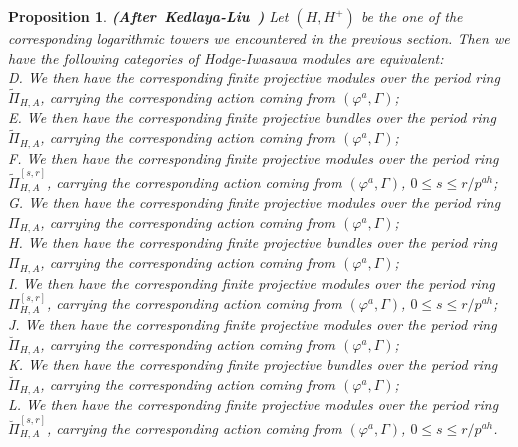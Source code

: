 \documentclass[12pt]{amsart}
\newtheorem{proposition}[theorem]{Proposition}
\theoremstyle{definition}
\numberwithin{equation}{section}
\begin{document}
\begin{proposition} \mbox{\bf{(After Kedlaya-Liu \cite[Theorem 5.7.4]{KL16})}} Let $(H,H^+)$ be the one of the corresponding logarithmic towers we encountered in the previous section. Then we have the following categories of Hodge-Iwasawa modules are equivalent:\\
\noindent D. We then have the corresponding finite projective modules over the period ring ${\widetilde{\Pi}}_{H,A}$, carrying the corresponding action coming from $(\varphi^a,\Gamma)$;\\
\noindent E. We then have the corresponding finite projective bundles over the period ring ${\widetilde{\Pi}}_{H,A}$, carrying the corresponding action coming from $(\varphi^a,\Gamma)$;\\
\noindent F. We then have the corresponding finite projective modules over the period ring ${\widetilde{\Pi}}^{[s,r]}_{H,A}$, carrying the corresponding action coming from $(\varphi^a,\Gamma)$, $0\leq s\leq r/p^{ah}$;\\
\noindent G. We then have the corresponding finite projective modules over the period ring ${{\Pi}}_{H,A}$, carrying the corresponding action coming from $(\varphi^a,\Gamma)$;\\
\noindent H. We then have the corresponding finite projective bundles over the period ring ${{\Pi}}_{H,A}$, carrying the corresponding action coming from $(\varphi^a,\Gamma)$;\\
\noindent I. We then have the corresponding finite projective modules over the period ring ${{\Pi}}^{[s,r]}_{H,A}$, carrying the corresponding action coming from $(\varphi^a,\Gamma)$, $0\leq s\leq r/p^{ah}$;\\
\noindent J. We then have the corresponding finite projective modules over the period ring ${\breve{\Pi}}_{H,A}$, carrying the corresponding action coming from $(\varphi^a,\Gamma)$;\\
\noindent K. We then have the corresponding finite projective bundles over the period ring ${\breve{\Pi}}_{H,A}$, carrying the corresponding action coming from $(\varphi^a,\Gamma)$;\\
\noindent L. We then have the corresponding finite projective modules over the period ring ${\breve{\Pi}}^{[s,r]}_{H,A}$, carrying the corresponding action coming from $(\varphi^a,\Gamma)$, $0\leq s\leq r/p^{ah}$.\\
\end{proposition}
\end{document}

